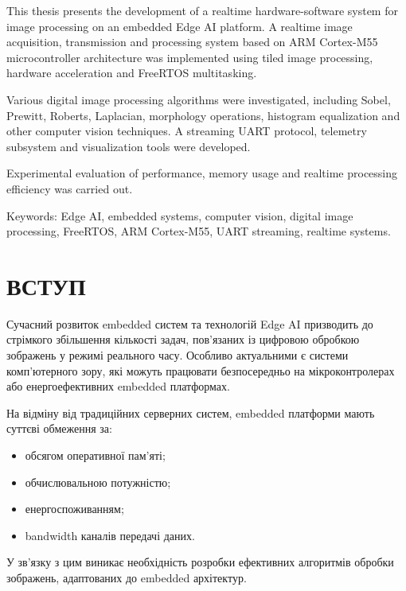 \documentclass[14pt,a4paper]{extreport}
\begin{document}
This thesis presents the development of a realtime hardware-software
system for image processing on an embedded Edge AI platform.
A realtime image acquisition, transmission and processing system
based on ARM Cortex-M55 microcontroller architecture was implemented
using tiled image processing, hardware acceleration and FreeRTOS multitasking.

Various digital image processing algorithms were investigated,
including Sobel, Prewitt, Roberts, Laplacian, morphology operations,
histogram equalization and other computer vision techniques.
A streaming UART protocol, telemetry subsystem and visualization tools
were developed.

Experimental evaluation of performance, memory usage and realtime
processing efficiency was carried out.

Keywords:
Edge AI, embedded systems, computer vision, digital image processing,
FreeRTOS, ARM Cortex-M55, UART streaming, realtime systems.


\tableofcontents
\newpage


\chapter*{ВСТУП}

Сучасний розвиток embedded систем та технологій Edge AI
призводить до стрімкого збільшення кількості задач,
пов’язаних із цифровою обробкою зображень у режимі реального часу.
Особливо актуальними є системи комп’ютерного зору,
які можуть працювати безпосередньо на мікроконтролерах
або енергоефективних embedded платформах.

На відміну від традиційних серверних систем,
embedded платформи мають суттєві обмеження за:
\begin{itemize}
    \item обсягом оперативної пам’яті;
    \item обчислювальною потужністю;
    \item енергоспоживанням;
    \item bandwidth каналів передачі даних.
\end{itemize}

У зв’язку з цим виникає необхідність розробки
ефективних алгоритмів обробки зображень,
адаптованих до embedded архітектур.
\end{document}
